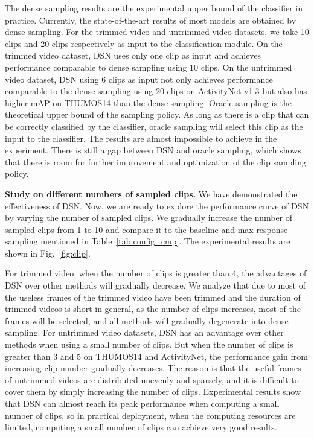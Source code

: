 \documentclass[journal]{IEEEtran}
\begin{document}
The dense sampling results are the experimental upper bound of the classifier in practice.
Currently, the state-of-the-art results of most models are obtained by dense sampling.
For the trimmed video and untrimmed video datasets, we take 10 clips and 20 clips respectively as input to the classification module.
On the trimmed video dataset, DSN uses only one clip as input and achieves performance comparable to dense sampling using 10 clips.
On the untrimmed video dataset, DSN using 6 clips as input not only achieves performance comparable to the dense sampling using 20 clips on ActivityNet v1.3 but also has higher mAP on THUMOS14 than the dense sampling.
Oracle sampling is the theoretical upper bound of the sampling policy.
As long as there is a clip that can be correctly classified by the classifier, oracle sampling will select this clip as the input to the classifier.
The results are almost impossible to achieve in the experiment.
There is still a gap between DSN and oracle sampling, which shows that there is room for further improvement and optimization of the clip sampling policy.


\textbf{Study on different numbers of sampled clips.}
We have demonstrated the effectiveness of DSN.
Now, we are ready to explore the performance curve of DSN by varying the number of sampled clips.
We gradually increase the number of sampled clips from 1 to 10 and compare it to the baseline and max response sampling mentioned in Table~\ref{tab:config_cmp}.
The experimental results are shown in Fig.~\ref{fig:clip}.

For trimmed video, when the number of clips is greater than 4, the advantages of DSN over other methods will gradually decrease.
We analyze that due to most of the useless frames of the trimmed video have been trimmed and the duration of trimmed videos is short in general, as the number of clips increases,  most of the frames will be selected, and all methods will gradually degenerate into dense sampling.
For untrimmed video datasets, DSN has an advantage over other methods when using a small number of clips.
But when the number of clips is greater than 3 and 5 on THUMOS14 and ActivityNet, the performance gain from increasing clip number gradually decreases.
The reason is that the useful frames of untrimmed videos are distributed unevenly and sparsely, and it is difficult to cover them by simply increasing the number of clips.
Experimental results show that DSN can almost reach its peak performance when computing a small number of clips, so in practical deployment, when the computing resources are limited, computing a small number of clips can achieve very good results.
\end{document}

